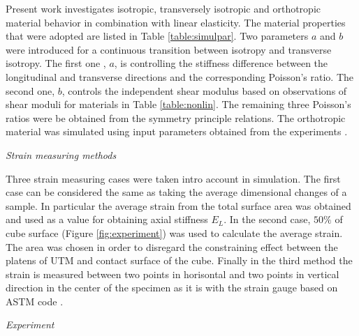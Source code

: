 \documentclass[review]{elsarticle}
\begin{document}
Present work investigates isotropic, transversely isotropic and orthotropic
material behavior in combination with linear elasticity.
The material properties that were adopted are listed in
Table \ref{table:simulpar}. Two parameters $a$ and $b$ were introduced for a continuous transition between isotropy and transverse isotropy. 
The first one , $a$, is controlling the stiffness difference between the
longitudinal and transverse directions and the corresponding Poisson's ratio.
The second one, $b$, controls the independent shear modulus based on
observations of shear moduli for materials in Table \ref{table:nonlin}.
The remaining three Poisson's ratios were be obtained from the symmetry
principle relations. The orthotropic material was simulated using input parameters obtained from the experiments \cite{vorobyevcharacterisation}.


\begin{description}
\item{\textit{Strain measuring methods}}
\end{description}


Three strain measuring cases were taken intro account in simulation. The first
case can be considered the same as taking the average dimensional changes of a
sample. In particular the average strain from the total surface area was
obtained and used as a value for obtaining axial stiffness $E_L$. In the
second case, $50\%$ of cube surface (Figure \ref{fig:experiment}) was
used to calculate the average strain. The area was chosen in order to disregard
the constraining effect between the platens of UTM and contact surface of the
cube.
Finally in the third method the strain is measured between two points
in horisontal and two points in vertical direction in the center of the specimen
as it is with the strain gauge based on ASTM code \cite{american2009standard}.

\begin{description}
\item{\textit{Experiment}}
\end{description}
\end{document}
